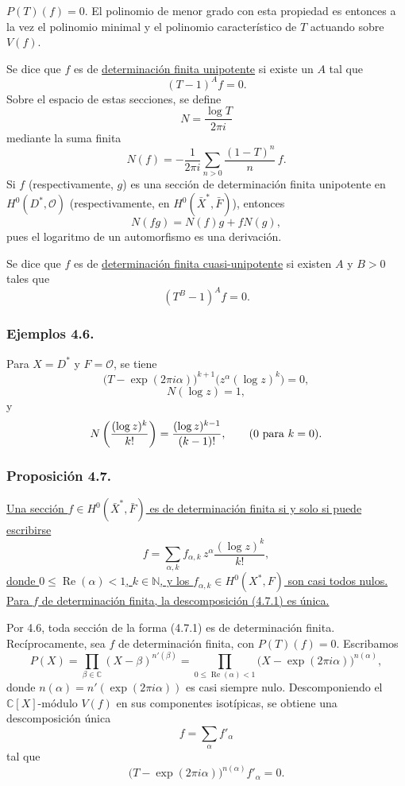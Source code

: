 \pageoriginale

$P(T)(f)=0$. El polinomio de menor grado con esta propiedad es entonces
a la vez el polinomio minimal y el polinomio característico de $T$
actuando sobre $V(f)$.

Se dice que $f$ es de \underline{determinación finita unipotente} si
existe un $A$ tal que
\[
(T-1)^A f=0.
\]
Sobre el espacio de estas secciones, se define
\[
N=\frac{\log T}{2\pi i}
\]
mediante la suma finita
\[
N(f)=-\frac1{2\pi i}
\sum_{n>0}\frac{(1-T)^n}{n}\,f.
\]
Si $f$ (respectivamente, $g$) es una sección de determinación finita
unipotente en $H^0(D^*,\mathcal O)$ (respectivamente, en
$H^0(\bar X^*,\bar F)$), entonces
\[
N(fg)=N(f)g+fN(g),
\]
pues el logaritmo de un automorfismo es una derivación.

Se dice que $f$ es de
\underline{determinación finita cuasi-unipotente} si existen $A$ y
$B>0$ tales que
\[
(T^B-1)^A f=0.
\]

\subsubsection*{Ejemplos 4.6.}
Para $X=D^*$ y $F=\mathcal O$, se tiene
\[
\bigl(T-\exp(2\pi i\alpha)\bigr)^{k+1}
  \bigl(z^\alpha(\log z)^k\bigr)=0,
\]
\[
N(\log z)=1,
\]
y
\[
\sisi{N\frac{(\log z)^k}{k!})}{N\left(\frac{(\log z)^k}{k!}\right)}
=\frac{(\log z)^{k-1}}{(k-1)!},
\qquad
(0\text{ para }k=0).
\]

\subsubsection*{Proposición 4.7.}
\underline{Una sección $f\in H^0(\bar X^*,\bar F)$ es de determinación
finita si y solo si puede escribirse}
\begin{equation}\tag{4.7.1}
f=\sum_{\alpha,k}f_{\alpha,k}\,
z^\alpha\frac{(\log z)^k}{k!},
\end{equation}
\underline{donde $0\leq\operatorname{Re}(\alpha)<1$,
$k\in\mathbb N$, y los
$f_{\alpha,k}\in H^0(X^*,F)$ son casi todos nulos. Para $f$ de
determinación finita, la descomposición (4.7.1) es única.}

\pageoriginale

Por 4.6, toda sección de la forma (4.7.1) es de determinación finita.
Recíprocamente, sea $f$ de determinación finita, con $P(T)(f)=0$.
Escribamos
\[
P(X)=\prod_{\beta\in\mathbb C}(X-\beta)^{n'(\beta)}
=\prod_{0\leq\operatorname{Re}(\alpha)<1}
 \bigl(X-\exp(2\pi i\alpha)\bigr)^{n(\alpha)},
\]
donde $n(\alpha)=n'(\exp(2\pi i\alpha))$ es casi siempre nulo.
Descomponiendo el $\mathbb C[X]$-módulo $V(f)$ en sus componentes
isotípicas, se obtiene una descomposición única
\[
f=\sum_\alpha f'_\alpha
\]
tal que
\[
\bigl(T-\exp(2\pi i\alpha)\bigr)^{n(\alpha)}f'_\alpha=0.
\]

